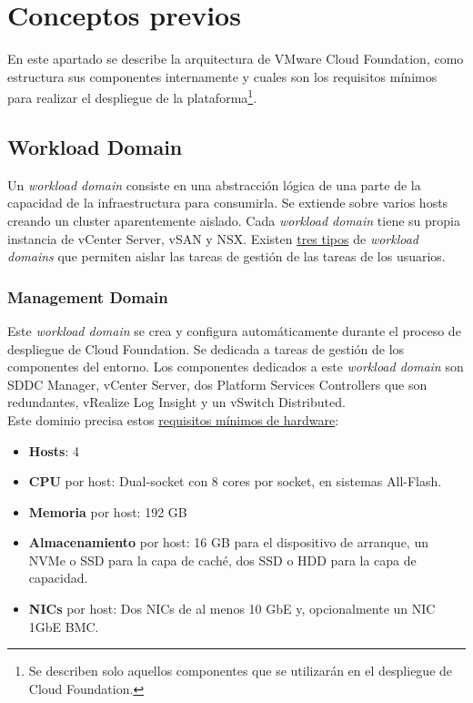 \section{Conceptos previos}
En este apartado se describe la arquitectura de VMware Cloud Foundation, como estructura sus componentes internamente y cuales son los requisitos mínimos para realizar el despliegue de la plataforma\footnote{Se describen solo aquellos componentes que se utilizarán en el despliegue de Cloud Foundation.}.

\subsection{Workload Domain}
Un \textit{workload domain} consiste en una abstracción lógica de una parte de la capacidad de la infraestructura para consumirla. Se extiende sobre varios hosts creando un cluster aparentemente aislado. Cada \textit{workload domain} tiene su propia instancia de vCenter Server, vSAN y NSX. Existen \underline{tres tipos} de \textit{workload domains} que permiten aislar las tareas de gestión de las tareas de los usuarios. 

\subsubsection{Management Domain}
\label{subsubsec:domainManagement}
Este \textit{workload domain} se crea y configura automáticamente durante el proceso de despliegue de Cloud Foundation. Se dedicada a tareas de gestión de los componentes del entorno. Los componentes dedicados a este \textit{workload domain} son SDDC Manager, vCenter Server, dos Platform Services Controllers que son redundantes, vRealize Log Insight y un vSwitch Distributed.\\
Este dominio precisa estos \underline{requisitos mínimos de hardware}:
\begin{itemize}
    \item \textbf{Hosts}: 4
    \item \textbf{CPU} por host: Dual-socket con 8 cores por socket, en sistemas All-Flash.
    \item \textbf{Memoria} por host: 192 GB
    \item \textbf{Almacenamiento} por host: 16 GB para el dispositivo de arranque, un NVMe o SSD para la capa de caché, dos SSD o HDD para la capa de capacidad.
    \item \textbf{NICs} por host: Dos NICs de al menos 10 GbE y, opcionalmente un NIC 1GbE BMC.
\end{itemize}

